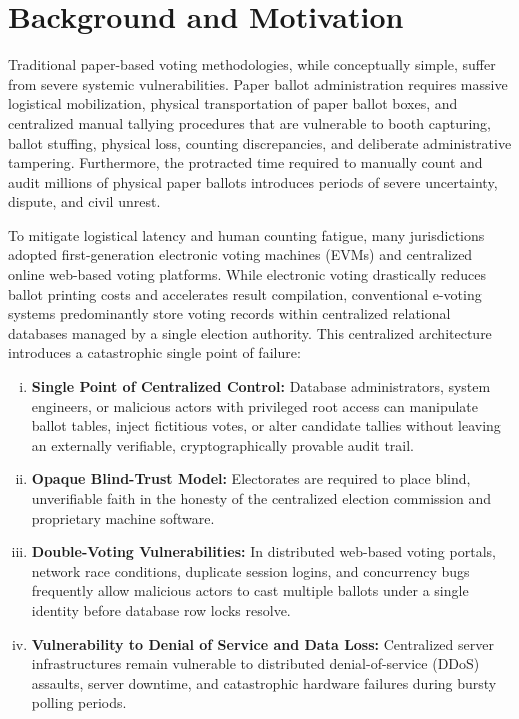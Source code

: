 \documentclass[12pt,a4paper]{report}
\begin{document}
\section{Background and Motivation}
Traditional paper-based voting methodologies, while conceptually simple, suffer from severe systemic vulnerabilities. Paper ballot administration requires massive logistical mobilization, physical transportation of paper ballot boxes, and centralized manual tallying procedures that are vulnerable to booth capturing, ballot stuffing, physical loss, counting discrepancies, and deliberate administrative tampering. Furthermore, the protracted time required to manually count and audit millions of physical paper ballots introduces periods of severe uncertainty, dispute, and civil unrest.

To mitigate logistical latency and human counting fatigue, many jurisdictions adopted first-generation electronic voting machines (EVMs) and centralized online web-based voting platforms. While electronic voting drastically reduces ballot printing costs and accelerates result compilation, conventional e-voting systems predominantly store voting records within centralized relational databases managed by a single election authority. This centralized architecture introduces a catastrophic single point of failure:
\begin{enumerate}[(i)]
    \item \textbf{Single Point of Centralized Control:} Database administrators, system engineers, or malicious actors with privileged root access can manipulate ballot tables, inject fictitious votes, or alter candidate tallies without leaving an externally verifiable, cryptographically provable audit trail.
    \item \textbf{Opaque Blind-Trust Model:} Electorates are required to place blind, unverifiable faith in the honesty of the centralized election commission and proprietary machine software.
    \item \textbf{Double-Voting Vulnerabilities:} In distributed web-based voting portals, network race conditions, duplicate session logins, and concurrency bugs frequently allow malicious actors to cast multiple ballots under a single identity before database row locks resolve.
    \item \textbf{Vulnerability to Denial of Service and Data Loss:} Centralized server infrastructures remain vulnerable to distributed denial-of-service (DDoS) assaults, server downtime, and catastrophic hardware failures during bursty polling periods.
\end{enumerate}
\end{document}
